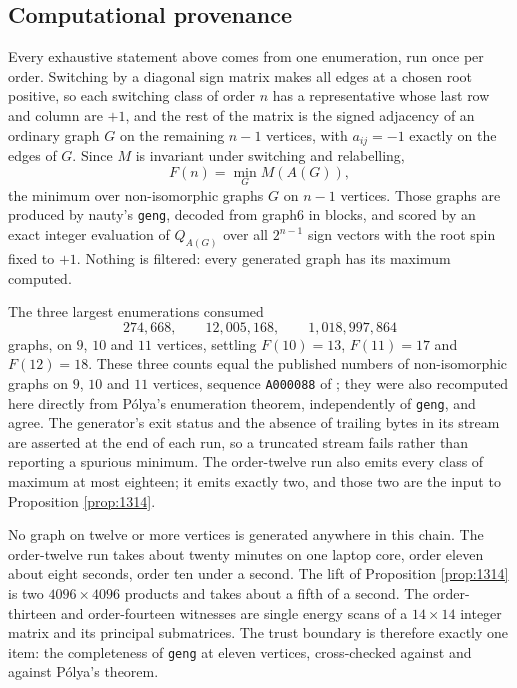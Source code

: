 \documentclass[11pt]{article}
\theoremstyle{remark}
\begin{document}
\subsection{Computational provenance}\label{sec:prov}

Every exhaustive statement above comes from one enumeration, run once per
order.  Switching by a diagonal sign matrix makes all edges at a chosen root
positive, so each switching class of order $n$ has a representative whose
last row and column are $+1$, and the rest of the matrix is the signed
adjacency of an ordinary graph $G$ on the remaining $n-1$ vertices, with
$a_{ij}=-1$ exactly on the edges of $G$.  Since $M$ is invariant under
switching and relabelling,
\[
 F(n)=\min_{G}M(A(G)),
\]
the minimum over non-isomorphic graphs $G$ on $n-1$ vertices.  Those graphs
are produced by nauty's \texttt{geng}, decoded from graph6 in blocks, and
scored by an exact integer evaluation of $Q_{A(G)}$ over all $2^{n-1}$ sign
vectors with the root spin fixed to $+1$.  Nothing is filtered: every
generated graph has its maximum computed.

The three largest enumerations consumed
\[
 274{,}668,\qquad 12{,}005{,}168,\qquad 1{,}018{,}997{,}864
\]
graphs, on $9$, $10$ and $11$ vertices, settling $F(10)=13$, $F(11)=17$ and
$F(12)=18$.  These three counts equal the published numbers of non-isomorphic
graphs on $9$, $10$ and $11$ vertices, sequence \texttt{A000088}
of \cite{oeis}; they were also recomputed here directly from P\'olya's
enumeration theorem, independently of \texttt{geng}, and agree.  The
generator's exit status and the absence of trailing bytes in its stream are
asserted at the end of each run, so a truncated stream fails rather than
reporting a spurious minimum.  The order-twelve run also emits every class of
maximum at most eighteen; it emits exactly two, and those two are the input to
Proposition \ref{prop:1314}.

No graph on twelve or more vertices is generated anywhere in this chain.  The
order-twelve run takes about twenty minutes on one laptop core, order eleven
about eight seconds, order ten under a second.  The lift of
Proposition \ref{prop:1314} is two $4096\times4096$ products and takes about a
fifth of a second.  The order-thirteen and order-fourteen witnesses are single
energy scans of a $14\times14$ integer matrix and its principal submatrices.
The trust boundary is therefore exactly one item: the completeness of
\texttt{geng} at eleven vertices, cross-checked against \cite{oeis} and
against P\'olya's theorem.
\end{document}

